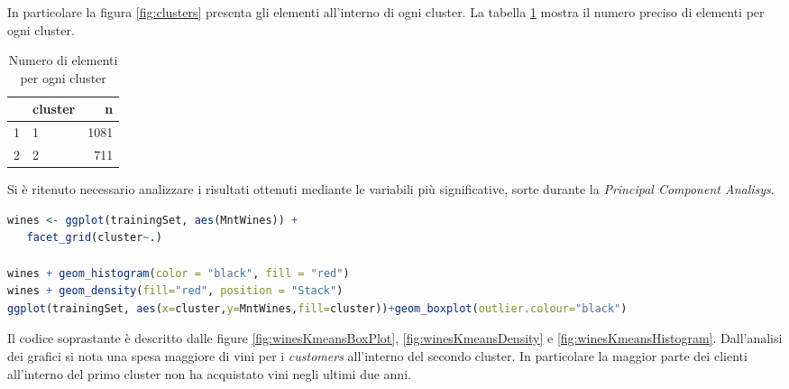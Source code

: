 \documentclass[letterpaper,11pt]{article}
\begin{document}
In particolare la figura \ref{fig:clusters} presenta gli elementi all'interno di ogni cluster. La tabella \ref{fig:clustersnumberelements} mostra il numero preciso di elementi per ogni cluster.
\begin{table}[h!t]
\centering
\begin{tabular}{rlr}
  \hline
 & cluster & n \\ 
  \hline
1 & 1 & 1081 \\ 
  2 & 2 & 711 \\ 
   \hline
\end{tabular}
\caption{Numero di elementi per ogni cluster}
\label{fig:clustersnumberelements}
\end{table}
Si è ritenuto necessario analizzare i risultati ottenuti mediante le variabili più significative, sorte durante la \textit{Principal Component Analisys}. 
\begin{lstlisting}[language=R]
wines <- ggplot(trainingSet, aes(MntWines)) + 
   facet_grid(cluster~.) 

wines + geom_histogram(color = "black", fill = "red") 
wines + geom_density(fill="red", position = "Stack")
ggplot(trainingSet, aes(x=cluster,y=MntWines,fill=cluster))+geom_boxplot(outlier.colour="black")
\end{lstlisting}
Il codice soprastante è descritto dalle figure \ref{fig:winesKmeansBoxPlot}, \ref{fig:winesKmeansDensity} e \ref{fig:winesKmeansHistogram}. Dall'analisi dei grafici si nota una spesa maggiore di vini per i \textit{customers} all'interno del secondo cluster. In particolare la maggior parte dei clienti all'interno del primo cluster non ha acquistato vini negli ultimi due anni. 
\end{document}
